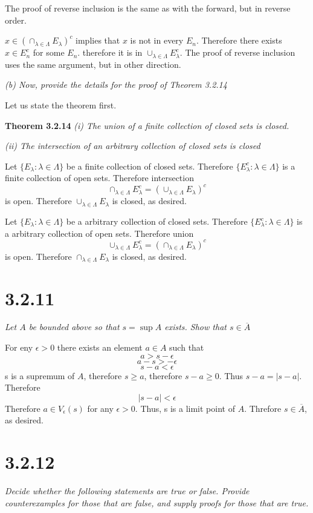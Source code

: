 \documentclass[11pt,oneside,titlepage]{book}
\begin{document}
The proof of reverse inclusion is the same as with the forward, but in reverse
order.

$x \in \left(\cap_{\lambda \in \Lambda} E_\lambda \right)^c$ implies that
$x$ is not in every $E_n$. Therefore there exists $x \in E_n^c$ for some $E_n$.
therefore it is in $\cup_{\lambda \in \Lambda} E_\lambda^c$. The proof of
reverse inclusion uses the same argument, but in other direction.

\textit{(b) Now, provide the details for the proof of Theorem 3.2.14}

Let us state the theorem first.

\textbf{Theorem 3.2.14}
\textit{(i) The union of a finite collection of closed sets is closed.}

\textit{(ii) The intersection of an arbitrary collection of closed sets is closed}

Let $\{E_\lambda: \lambda \in \Lambda\}$ be a finite collection of closed sets.
Therefore $\{E_\lambda^c: \lambda \in \Lambda\}$ is a finite collection of open
sets. Therefore intersection
$$\cap_{\lambda \in \Lambda} E_\lambda^c = (\cup_{\lambda \in \Lambda} E_\lambda)^c$$
is open. Therefore $\cup_{\lambda \in \Lambda} E_\lambda$ is closed, as desired.

Let $\{E_\lambda: \lambda \in \Lambda\}$ be a arbitrary collection of closed sets.
Therefore $\{E_\lambda^c: \lambda \in \Lambda\}$ is a arbitrary collection of open
sets. Therefore union
$$\cup_{\lambda \in \Lambda} E_\lambda^c = (\cap_{\lambda \in \Lambda} E_\lambda)^c$$
is open. Therefore $\cap_{\lambda \in \Lambda} E_\lambda$ is closed, as desired.

\section*{3.2.11}
\textit{Let $A$ be bounded above so that $s = \sup A$ exists. Show that
  $s \in \overline A$}

For eny $\epsilon > 0$ there exists an element $a \in A$ such that
$$a > s - \epsilon$$
$$a - s > - \epsilon$$
$$s - a < \epsilon$$
s is a supremum of $A$, therefore $s \geq a$, therefore $s - a \geq 0$. Thus
$s - a = |s - a|$. Therefore 
$$|s - a| < \epsilon$$
Therefore $a \in V_\epsilon(s)$ for any $\epsilon > 0$. Thus, s is a limit point of
$A$. Threfore $s \in \overline A$, as desired.

\section*{3.2.12}
\textit{Decide whether the following statements are true or false. Provide counterexamples for those that are false, and supply proofs for those that are true.}
\end{document}
